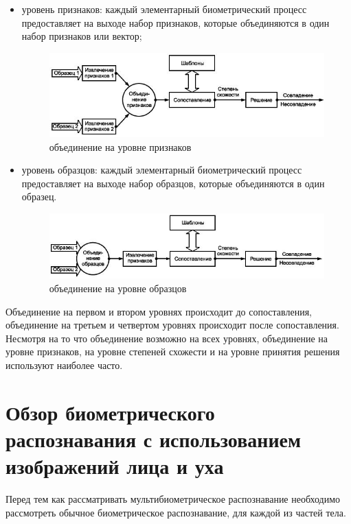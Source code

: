 \documentclass[12pt,a4paper]{article}					%
\begin{document}
\begin{itemize}
\item уровень признаков: каждый элементарный биометрический процесс предоставляет на выходе набор признаков, которые объединяются в один набор признаков или вектор;

\begin{figure}[h!]
\centering
\includegraphics[scale=0.60]{res/bio_c}
\caption{объединение на уровне признаков}
\end{figure}

\item уровень образцов: каждый элементарный биометрический процесс предоставляет на выходе набор образцов, которые объединяются в один образец.

\begin{figure}[h!]
\centering
\includegraphics[scale=0.60]{res/bio_d}
\caption{объединение на уровне образцов}
\end{figure}

\end{itemize}

Объединение на первом и втором уровнях происходит до сопоставления, объединение на третьем и четвертом уровнях происходит после сопоставления. Несмотря на то что объединение возможно на всех уровнях, объединение на уровне признаков, на уровне степеней схожести и на уровне принятия решения используют наиболее часто.


\section{Обзор биометрического распознавания с использованием изображений лица и уха}

Перед тем как рассматривать мультибиометрическое распознавание необходимо рассмотреть обычное биометрическое распознавание, для каждой из частей тела.
\end{document}
